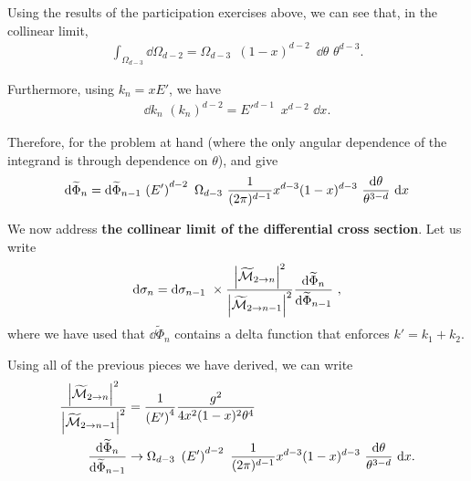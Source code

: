 Using the results of the participation exercises above, we can see that, in the collinear limit,
\begin{align}
    \int_{\Omega_{d-3}} \dd \Omega_{d-2}
    =
    \Omega_{d-3}
    \,\,\,
    (1-x)^{d-2}
    \,\,\,
    \dd \theta
    \,\,
    \theta^{d-3}
    .
\end{align}

Furthermore, using \(k_n = x E'\), we have
\begin{align}
    \dd k_n \,\, (k_n)^{d-2}
    =
    E'^{d-1}
    \,\,\,
    x^{d-2}
    \,\,
    \dd x
    .
\end{align}

Therefore, for the problem at hand (where the only angular dependence of the integrand is through dependence on \(\theta\)),  and  give
\begin{align}
    \dd \widetilde\Phi_n
    =
    \dd\widetilde\Phi_{n-1}
    \,
    \left(E'\right)^{d-2}
    \,\,
    \Omega_{d-3}
    \,\,
    \frac{1}{(2\pi)^{d-1}}
    x^{d-3}
    (1-x)^{d-3}
    \,\,
    \frac{\dd \theta}{\theta^{3-d}}
    \,\,
    \dd x
\end{align}

We now address \textbf{the collinear limit of the differential cross section}.
%
Let us write
\begin{align}
    \dd \sigma_n
    =
    \dd\sigma_{n-1}
    \,\,
    \times
    \frac{\left|\widetilde{\mathcal{M}}_{2\to n}\right|^2}
    {\left|\widetilde{\mathcal{M}}_{2\to {n-1}}\right|^2}
    \frac{\dd\widetilde{\Phi}_n}{\dd \widetilde\Phi_{n-1}}
    \
    ,
\end{align}
where we have used that \(\dd \widetilde\Phi_n\) contains a delta function that enforces \(k' = k_1 + k_2\).


Using all of the previous pieces we have derived, we can write
\begin{align}
    \frac{\left|\widetilde{\mathcal{M}}_{2\to n}\right|^2}
    {\left|\widetilde{\mathcal{M}}_{2\to {n-1}}\right|^2}
    &=
    \frac{1}{\left(E'\right)^4}
    \frac{g^2}{4 x^2 (1-x)^2 \theta^4}
    \\
    \frac{\dd\widetilde{\Phi}_n}{\dd \widetilde\Phi_{n-1}}
    &\to
    \Omega_{d-3}
    \,\,
    \left(E'\right)^{d-2}
    \,\,
    \frac{1}{(2\pi)^{d-1}}
    x^{d-3}
    (1-x)^{d-3}
    \,\,
    \frac{\dd \theta}{\theta^{3-d}}
    \,\,
    \dd x
    .
\end{align}

